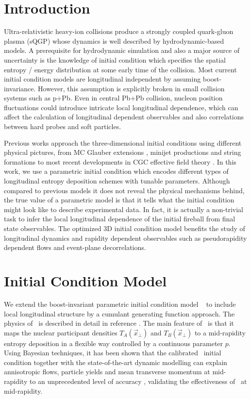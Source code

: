 \documentclass[3p,times,twocolumn]{elsarticle}
\begin{document}

\section{Introduction}
\label{Introduction}
Ultra-relativistic heavy-ion collisions produce a strongly coupled quark-gluon plasma (sQGP) whose dynamics is well described by hydrodynamic-based models.
A prerequisite for hydrodynamic simulation and also a major source of uncertainty  is the knowledge of initial condition which specifies the spatial entropy / energy distribution at some early time of the collision.
Most current initial condition models are longitudinal independent by assuming boost-invariance.
However, this assumption is explicitly broken in small collision systems such as p+Pb.
Even in central Pb+Pb collision, nucleon position fluctuations could introduce intricate local longitudinal dependence, which can affect the calculation of longitudinal dependent observables and also correlations between hard probes and soft particles.

Previous works approach the three-dimensional initial conditions using different physical pictures, from MC Glauber extensions \cite{Bozek:2015bha}, minijet productions and string formations \cite{Wang:1991hta} to most recent developments in CGC effective field theory \cite{Schenke:2016ksl}.
In this work, we use a parametric initial condition which encodes different types of longitudinal entropy deposition schemes with tunable parameters.
Although compared to previous models it does not reveal the physical mechanisms behind, the true value of a parametric model is that it tells what the initial condition might look like to describe experimental data.
In fact, it is actually a non-trivial task to infer the local longitudinal dependence of the initial fireball from final state observables.
The optimized 3D initial condition model benefits the study of longitudinal dynamics and rapidity dependent observables such as pseudorapidity dependent flows and event-plane decorrelations.

\section{Initial Condition Model}
\label{Model}
We extend the boost-invariant parametric initial condition model \trento~\cite{Moreland:2014oya} to include local longitudinal structure by a cumulant generating function approach.
The physics of \trento~is described in detail in reference \cite{Moreland:2014oya}. The main feature of \trento~is that it maps the nuclear participant densities $T_A(\vec{x}_{\perp})$ and $T_B(\vec{x}_{\perp})$ to a mid-rapidity entropy deposition in a flexible way controlled by a continuous parameter $p$.
Using Bayesian techniques, it has been shown that the calibrated \trento~initial condition together with the state-of-the-art dynamic modelling can explain annisotropic flows, particle yields and mean transverse momentum at mid-rapidity to an unprecedented level of accuracy \cite{Bernhard:2016tnd}, validating the effectiveness of \trento~at mid-rapidity.
\end{document}
